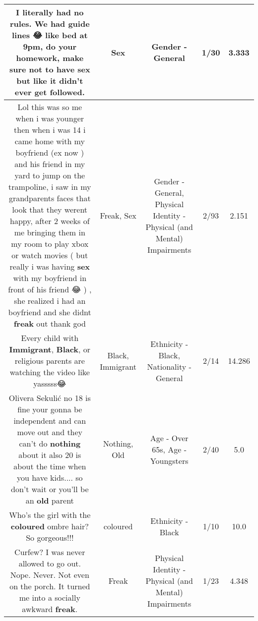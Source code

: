 \documentclass[11pt]{article}
\newlength\mylength
\begin{document}
\begin{center}
\begin{longtable}{|C{.65\mylength}|C{.30\mylength}|C{.12\mylength}|C{.12\mylength}|C{.12\mylength}|}
  \small I literally had no rules. We had guide lines 😂 like bed at 9pm, do your homework, make sure not to have \textbf{sex} but like it didn't ever get followed.\normalsize   & Sex & Gender - General & 1/30 & 3.333 \\  \hline
  \small Lol this was so me when i was younger then when i was 14 i came home with my boyfriend (ex now ) and his friend in my yard to jump on the trampoline, i saw in my grandparents faces that look that they werent happy, after 2 weeks of me bringing them in my room to play xbox or watch movies ( but really i was having \textbf{sex} with my boyfriend in front of his friend 😂 ) , she realized i had an boyfriend and she didnt \textbf{freak} out thank god\normalsize   & Freak, Sex & Gender - General, Physical Identity - Physical (and Mental) Impairments & 2/93 & 2.151 \\  \hline
  \small Every child with \textbf{Immigrant}, \textbf{Black}, or religious parents are watching the video like yasssss😂\normalsize   & Black, Immigrant & Ethnicity - Black, Nationality - General & 2/14 & 14.286 \\  \hline
  \small Olivera Sekulić no 18 is fine your gonna be independent and can move out and they can't do \textbf{nothing} about it also 20 is about the time when you have kids.... so don't wait or you'll be an \textbf{old} parent\normalsize   & Nothing, Old & Age - Over 65s, Age - Youngsters & 2/40 & 5.0 \\  \hline
  \small Who's the girl with the \textbf{coloured} ombre hair? So gorgeous!!!\normalsize   & coloured & Ethnicity - Black & 1/10 & 10.0 \\  \hline
  \small Curfew? I was never allowed to go out. Nope. Never. Not even on the porch. It turned me into a socially awkward \textbf{freak}.\normalsize   & Freak & Physical Identity - Physical (and Mental) Impairments & 1/23 & 4.348 \\  \hline

\end{longtable}
\end{center}
\end{document}
